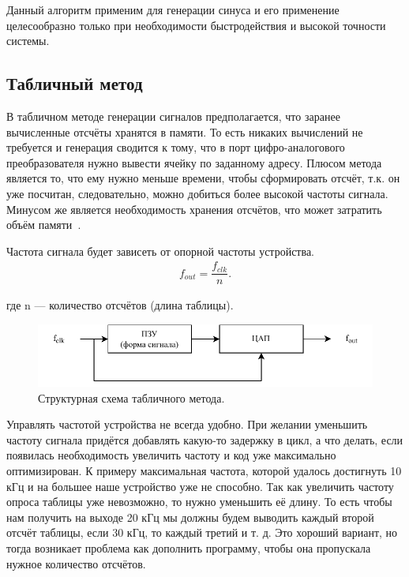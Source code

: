 	Данный алгоритм применим для генерации синуса и его применение целесообразно только при необходимости быстродействия и высокой точности системы.
	
\subsection{Табличный метод}		
	В табличном методе генерации сигналов предполагается, что заранее вычисленные отсчёты хранятся в памяти. То есть никаких вычислений не требуется и генерация сводится к тому, что в порт цифро-аналогового преобразователя нужно вывести ячейку по заданному адресу. 
	Плюсом метода является то, что ему нужно меньше времени, чтобы сформировать отсчёт, т.к. он уже посчитан, следовательно, можно добиться более высокой частоты сигнала. Минусом же является необходимость хранения отсчётов, что может затратить объём памяти~\cite{leso}.
	
	Частота сигнала будет зависеть от опорной частоты устройства.
	\begin{gather}
	f_{out}=\dfrac{f_{clk}}{n}.
	\end{gather}	
	
	где n --- количество отсчётов (длина таблицы).	
	
	\begin{figure}[H]
	\centering
    \includegraphics[width=1\textwidth]{../image/table_func.pdf}
    \caption{Структурная схема табличного метода.}
	\end{figure}
	
	Управлять частотой устройства не всегда удобно. При желании уменьшить частоту сигнала придётся добавлять какую-то задержку в цикл, а что делать, если появилась необходимость увеличить частоту и код уже максимально оптимизирован. К примеру максимальная частота, которой удалось достигнуть 10 кГц и на большее наше устройство уже не способно. Так как увеличить частоту опроса таблицы уже невозможно, то нужно уменьшить её длину. То есть чтобы нам получить на выходе 20 кГц мы должны будем выводить каждый второй отсчёт таблицы, если 30 кГц, то каждый третий и т. д. Это хороший вариант, но тогда возникает проблема как дополнить программу, чтобы она пропускала нужное количество отсчётов.



